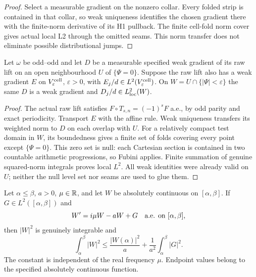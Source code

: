 \begin{proof}
\leanok
Select a measurable gradient on the nonzero collar.
Every folded strip is contained in that collar, so weak uniqueness identifies
the chosen gradient there with the finite-norm derivative of its H1 pullback.
The finite cell-fold norm cover gives actual local L2 through the omitted seams.
This norm transfer does not eliminate possible distributional jumps.
\end{proof}

\begin{lemma}
\label{lem:weighted-gradient-periodic-cover}
\leanok
Let $\omega$ be odd--odd and let $D$ be a measurable specified weak
gradient of its raw lift on an open neighbourhood $U$ of $\{\Psi=0\}$.
Suppose the raw lift also has a weak gradient $E$ on
$V_\varepsilon^{\rm cell}$, $\varepsilon>0$, with
$E_j/d\in L^2(V_\varepsilon^{\rm cell})$.
On $W=U\cap\{|\Psi|<\varepsilon\}$ the same $D$ is a weak gradient and
$D_j/d\in L^2_{\rm loc}(W)$.
\end{lemma}

\begin{proof}
\leanok
The actual raw lift satisfies $F\circ T_{s,n}=(-1)^sF$ a.e.,
by odd parity and exact periodicity. Transport $E$ with the affine rule.
Weak uniqueness transfers its weighted norm to $D$ on each overlap with $U$.
For a relatively compact test domain in $W$, its boundedness gives a
finite set of folds covering every point except $\{\Psi=0\}$.
This zero set is null: each Cartesian section is contained in two
countable arithmetic progressions, so Fubini applies.
Finite summation of genuine squared-norm integrals proves local $L^2$.
All weak identities were already valid on $U$; neither the null level set
nor seams are used to glue them.
\end{proof}

\begin{lemma}
\label{lem:damped-transport-energy}
\leanok
Let $\alpha\le\beta$, $a>0$, $\mu\in\mathbb{R}$, and let $W$ be absolutely
continuous on $[\alpha,\beta]$. If $G\in L^2([\alpha,\beta])$ and
\[
 W'=i\mu W-aW+G\quad\hbox{a.e. on }[\alpha,\beta],
\]
then $|W|^2$ is genuinely integrable and
\[
 \int_\alpha^\beta |W|^2
 \le \frac{|W(\alpha)|^2}{a}+\frac1{a^2}\int_\alpha^\beta |G|^2.
\]
The constant is independent of the real frequency $\mu$.
Endpoint values belong to the specified absolutely continuous function.
\end{lemma}

